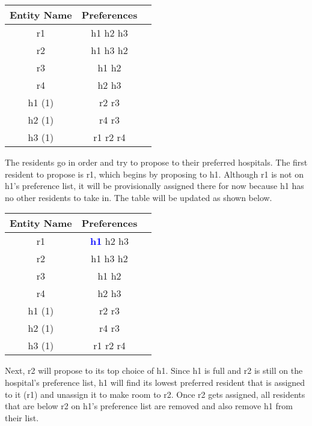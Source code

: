 \documentclass[letterpaper, 10pt,DIV=13]{scrartcl}
\numberwithin{equation}{section} %
\numberwithin{figure}{section} %
\numberwithin{table}{section} %
\begin{document}
\begin{center}
  \begin{tabular}{|c|c|c|}
    \hline
    Entity Name & Preferences \\
    \hline
    r1 & h1 h2 h3 \\
    \hline
    r2 & h1 h3 h2 \\
    \hline
    r3 & h1 h2 \\
    \hline
    r4 & h2 h3 \\
    \hline
    \hline
    h1 (1) & r2 r3 \\
    \hline
    h2 (1) & r4 r3 \\
    \hline
    h3 (1) & r1 r2 r4 \\
    \hline
  \end{tabular}
\end{center}

The residents go in order and try to propose to their preferred hospitals. The first resident to propose is r1, which begins by proposing to h1. Although r1 is not on h1's preference list, it will be provisionally assigned there for now because h1 has no other residents to take in. The table will be updated as shown below.

\begin{center}
  \begin{tabular}{|c|c|c|}
    \hline
    Entity Name & Preferences \\
    \hline
    r1 & \textcolor{blue}{\textbf{h1}} h2 h3 \\
    \hline
    r2 & h1 h3 h2 \\
    \hline
    r3 & h1 h2 \\
    \hline
    r4 & h2 h3 \\
    \hline
    \hline
    h1 (1) & r2 r3 \\
    \hline
    h2 (1) & r4 r3 \\
    \hline
    h3 (1) & r1 r2 r4 \\
    \hline
  \end{tabular}
\end{center}

Next, r2 will propose to its top choice of h1. Since h1 is full and r2 is still on the hospital's preference list, h1 will find its lowest preferred resident that is assigned to it (r1) and unassign it to make room to r2. Once r2 gets assigned, all residents that are below r2 on h1's preference list are removed and also remove h1 from their list.
\end{document}
